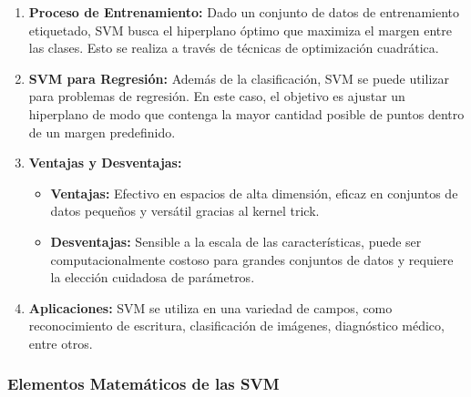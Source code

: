 \documentclass[12pt]{article}
\begin{document}
\begin{enumerate}
    \item \textbf{Proceso de Entrenamiento:}
        Dado un conjunto de datos de entrenamiento etiquetado, SVM busca el hiperplano óptimo que maximiza el margen entre las clases. Esto se realiza a través de técnicas de optimización cuadrática.

    \item \textbf{SVM para Regresión:}
        Además de la clasificación, SVM se puede utilizar para problemas de regresión. En este caso, el objetivo es ajustar un hiperplano de modo que contenga la mayor cantidad posible de puntos dentro de un margen predefinido.

    \item \textbf{Ventajas y Desventajas:}
        \begin{itemize}
            \item \textbf{Ventajas:} Efectivo en espacios de alta dimensión, eficaz en conjuntos de datos pequeños y versátil gracias al kernel trick.
            \item \textbf{Desventajas:} Sensible a la escala de las características, puede ser computacionalmente costoso para grandes conjuntos de datos y requiere la elección cuidadosa de parámetros.
        \end{itemize}

    \item \textbf{Aplicaciones:}
        SVM se utiliza en una variedad de campos, como reconocimiento de escritura, clasificación de imágenes, diagnóstico médico, entre otros.

\end{enumerate}


\subsubsection{Elementos Matemáticos de las SVM}
\end{document}
